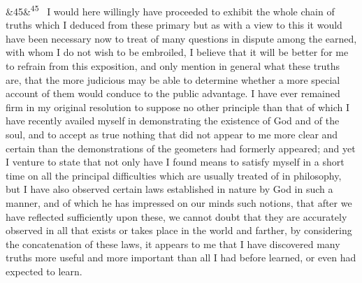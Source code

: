 \documentclass[12pt]{article}
\newcommand{\para}[1][]{\par\noindent\ifx&#1&\else\textsuperscript{\footnotesize #1}~\fi}
\begin{document}
\para[45] I would here willingly have proceeded to exhibit the whole chain of truths which I deduced from these primary but as with a view to this it would have been necessary now to treat of many questions in dispute among the earned, with whom I do not wish to be embroiled, I believe that it will be better for me to refrain from this exposition, and only mention in general what these truths are, that the more judicious may be able to determine whether a more special account of them would conduce to the public advantage. I have ever remained firm in my original resolution to suppose no other principle than that of which I have recently availed myself in demonstrating the existence of God and of the soul, and to accept as true nothing that did not appear to me more clear and certain than the demonstrations of the geometers had formerly appeared; and yet I venture to state that not only have I found means to satisfy myself in a short time on all the principal difficulties which are usually treated of in philosophy, but I have also observed certain laws established in nature by God in such a manner, and of which he has impressed on our minds such notions, that after we have reflected sufficiently upon these, we cannot doubt that they are accurately observed in all that exists or takes place in the world and farther, by considering the concatenation of these laws, it appears to me that I have discovered many truths more useful and more important than all I had before learned, or even had expected to learn.
\end{document}
